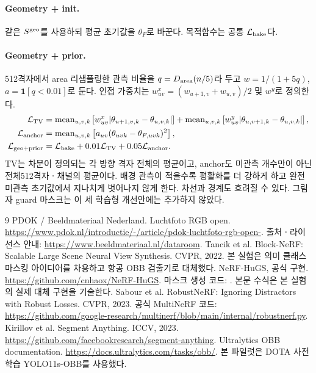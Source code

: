\documentclass[11pt,a4paper]{article}
\newcommand{\ind}{\mathbf{1}}
\newcommand{\mean}{\operatorname{mean}}
\begin{document}
\paragraph{Geometry + init.}
같은 $S^{\rm geo}$를 사용하되 평균 초기값을 $\theta_F$로 바꾼다. 목적함수는 공통 $\mathcal L_{\rm bake}$다.

\paragraph{Geometry + prior.}
512격자에서 area 리샘플링한 관측 비율을 $q=D_{\rm area}(n/5)$라 두고 $w=1/(1+5q)$, $a=\ind[q<0.01]$로 둔다. 인접 가중치는 $w^x_{uv}=(w_{u+1,v}+w_{u,v})/2$ 및 $w^y$로 정의한다.
\begin{align}
 \mathcal L_{\rm TV}
 &=\mean_{u,v,k}\left[w^x_{uv}|\theta_{u+1,v,k}-\theta_{u,v,k}|\right]
   +\mean_{u,v,k}\left[w^y_{uv}|\theta_{u,v+1,k}-\theta_{u,v,k}|\right],\\
 \mathcal L_{\rm anchor}
 &=\mean_{u,v,k}\left[a_{uv}(\theta_{uvk}-\theta_{F,uvk})^2\right],\\
 \mathcal L_{\rm geo+prior}
 &=\mathcal L_{\rm bake}+0.01\mathcal L_{\rm TV}+0.05\mathcal L_{\rm anchor}.
\end{align}
TV는 차분이 정의되는 각 방향 격자 전체의 평균이고, anchor도 미관측 개수만이 아닌 전체512격자ㆍ채널의 평균이다. 배경 관측이 적을수록 평활화를 더 강하게 하고 완전 미관측 초기값에서 지나치게 벗어나지 않게 한다. 차선과 경계도 흐려질 수 있다. 그림자 guard 마스크는 이 세 학습형 개선안에는 추가하지 않았다.

\begin{thebibliography}{9}
 PDOK / Beeldmateriaal Nederland. Luchtfoto RGB open. \url{https://www.pdok.nl/introductie/-/article/pdok-luchtfoto-rgb-open-}. 출처ㆍ라이선스 안내: \url{https://www.beeldmateriaal.nl/dataroom}.
 Tancik et al. Block-NeRF: Scalable Large Scene Neural View Synthesis. CVPR, 2022. 본 실험은 의미 클래스 마스킹 아이디어를 차용하고 항공 OBB 검출기로 대체했다.
 NeRF-HuGS, 공식 구현. \url{https://github.com/cnhaox/NeRF-HuGS}. 마스크 생성 코드: . 본문 수식은 본 실험의 실제 대체 구현을 기술한다.
 Sabour et al. RobustNeRF: Ignoring Distractors with Robust Losses. CVPR, 2023. 공식 MultiNeRF 코드: \url{https://github.com/google-research/multinerf/blob/main/internal/robustnerf.py}.
 Kirillov et al. Segment Anything. ICCV, 2023. \url{https://github.com/facebookresearch/segment-anything}.
 Ultralytics OBB documentation. \url{https://docs.ultralytics.com/tasks/obb/}. 본 파일럿은 DOTA 사전학습 YOLO11s-OBB를 사용했다.
\end{thebibliography}
\end{document}
